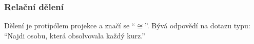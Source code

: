 \subsubsection{Relační dělení}
Dělení je protípólem projekce a značí se \enquote{$\cong$}. Bývá odpovědí na dotazu typu: \enquote{Najdi osobu, která obsolvovala každý kurz.}